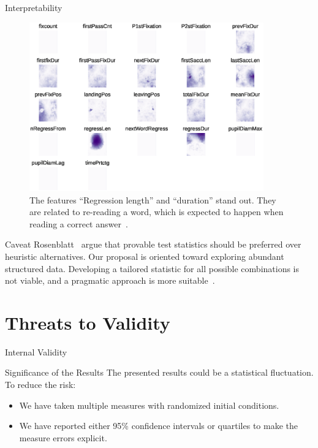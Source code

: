 \documentclass[10pt]{beamer}
\begin{document}
\begin{frame}{Interpretability}
    \begin{figure}
        \centering
        \includegraphics[trim=5pt 60pt 5pt 5pt,clip,width=0.9\textwidth]{eye_features.eps}
        \caption{
            The features ``Regression length'' and ``duration'' stand out.
            They are related to re-reading a word, which is expected to happen when reading a correct answer~\cite{salojarvi2005inferring}.
        }
    \end{figure}
\end{frame}


\begin{frame}{Caveat}
    Rosenblatt~\cite{rosenblatt2019better} argue that provable test statistics
    should be preferred over heuristic alternatives.
    \smallskip
    Our proposal is oriented toward \alert{exploring} abundant structured data.
    Developing a tailored statistic for all possible combinations is not viable,
    and a pragmatic approach is more suitable~\cite{kim2021classification}.
\end{frame}

\section{Threats to Validity}

\begin{frame}{Internal Validity}
    \begin{alertblock}{Significance of the Results}
        \smallskip
        The presented results could be a statistical fluctuation. To reduce the risk:
        
        \begin{itemize}
            \item We have taken multiple measures with randomized initial conditions.
            \item We have reported either 95\% confidence intervals or quartiles to make the measure errors explicit.
        \end{itemize}
    \end{alertblock}
\end{frame}
\end{document}
